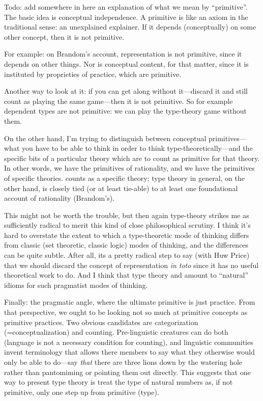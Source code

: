 \begin{ednote}
  Todo: add somewhere in here an explanation of what we mean by
  ``primitive''.  The basic idea is conceptual independence.  A
  primitive is like an axiom in the traditional sense: an unexplained
  explainer.  If it depends (conceptually) on some other concept, then
  it is not primitive.

  For example: on Brandom's account, representation is not primitive,
  since it depends on other things.  Nor is conceptual content, for
  that matter, since it is instituted by proprieties of practice,
  which are primitive.

  Another way to look at it: if you can get along without it---discard
  it and still count as playing the same game---then it is not
  primitive.  So for example dependent types are not primitive: we can
  play the type-theory game without them.

  On the other hand, I'm trying to distinguish between conceptual
  primitives---what you have to be able to think in order to think
  type-theoretically---and the specific bits of a particular theory
  which are to count as primitive for that theory.  In other words, we
  have the primitives of rationality, and we have the primitives of
  specific theories.  \HoTT counts as a specific theory; type theory in
  general, on the other hand, is closely tied (or at least tie-able)
  to at least one foundational account of rationality (Brandom's).

  This might not be worth the trouble, but then again type-theory
  strikes me as sufficiently radical to merit this kind of close
  philosophical scrutiny.  I think it's hard to overstate the extent
  to which a type-theoretic mode of thinking differs from classic (set
  theoretic, classic logic) modes of thinking, and the differences can
  be quite subtle.  After all, its a pretty radical step to say (with
  Huw Price\citep{price_naturalism_2010}) that we should
  discard the concept of representation \textit{in toto} since it has
  no useful theoretical work to do.  And I think that type theory and
  \HoTT amount to ``natural'' idioms for such pragmatist modes of
  thinking.

  Finally: the pragmatic angle, where the ultimate primitive is just
  practice.  From that perspective, we ought to be looking not so much
  at primitive concepts as primitive practices.  Two obvious
  candidates are categorization (=conceptualization) and counting.
  Pre-linguistic creatures can do both (language is not a necessary
  condition for counting), and linguistic communities invent
  terminology that allows there members to say what they otherwise
  would only be able to do---say \textit{that} there are three lions
  down by the watering hole rather than pantomiming or pointing them
  out directly.  This suggests that one way to present type theory is
  treat the type of natural numbers as, if not primitive, only one
  step up from primitive (type).
\end{ednote}

